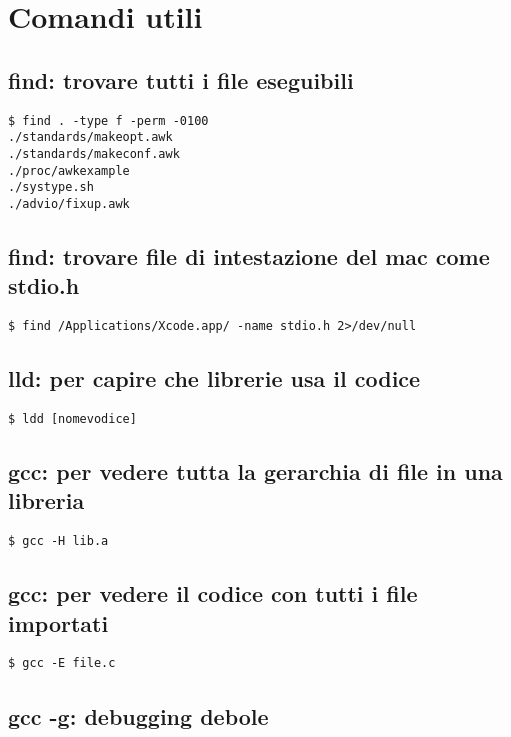 \newpage
\section{Comandi utili}

\subsection{find: trovare tutti i file eseguibili}
	
\begin{lstlisting}
$ find . -type f -perm -0100
./standards/makeopt.awk
./standards/makeconf.awk
./proc/awkexample
./systype.sh
./advio/fixup.awk
\end{lstlisting}


\subsection{find: trovare file di intestazione del mac come stdio.h}

\begin{lstlisting}
$ find /Applications/Xcode.app/ -name stdio.h 2>/dev/null
\end{lstlisting}


\subsection{lld: per capire che librerie usa il codice}

\begin{lstlisting}
$ ldd [nomevodice]
\end{lstlisting}


\subsection{gcc: per vedere tutta la gerarchia di file in una libreria}

\begin{lstlisting}
$ gcc -H lib.a
\end{lstlisting}


\subsection{gcc: per vedere il codice con tutti i file importati}

\begin{lstlisting}
$ gcc -E file.c
\end{lstlisting}

\subsection{gcc -g: debugging debole}

